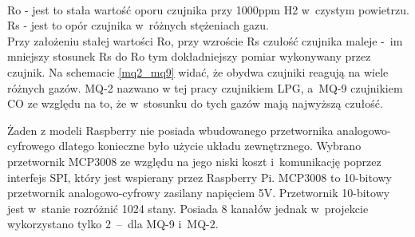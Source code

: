\\Ro - jest to stała wartość oporu czujnika przy 1000ppm H2 w~czystym powietrzu.\\
Rs - jest to opór czujnika w~różnych stężeniach gazu. \\
Przy założeniu stałej wartości Ro, przy wzroście Rs czułość czujnika maleje -~im mniejszy stosunek Rs do Ro tym dokładniejszy pomiar wykonywany przez czujnik. Na schemacie \ref{mq2_mq9} widać, że obydwa czujniki reagują na wiele różnych gazów. MQ-2 nazwano w tej pracy czujnikiem LPG, a~MQ-9 czujnikiem CO ze względu na to, że w~stosunku do tych gazów mają najwyższą czułość. 

Żaden z modeli Raspberry nie posiada wbudowanego przetwornika analogowo-cyfrowego dlatego konieczne było użycie układu zewnętrznego. Wybrano przetwornik MCP3008 ze względu na jego niski koszt i~komunikację poprzez interfejs SPI, który jest wspierany przez Raspberry Pi. MCP3008 to 10-bitowy przetwornik analogowo-cyfrowy zasilany napięciem 5V.  Przetwornik 10-bitowy jest w~stanie rozróżnić 1024 stany. Posiada 8 kanałów jednak w~projekcie wykorzystano tylko 2~–~dla MQ-9 i~MQ-2.
